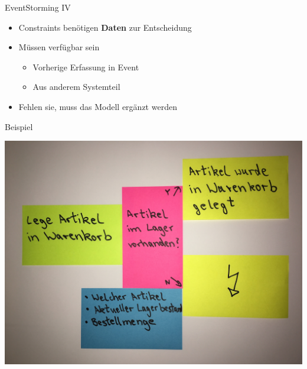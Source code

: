 
\begin{frame}[fragile]{EventStorming IV}

\begin{itemize}
\item Constraints benötigen \textbf{Daten} zur Entscheidung
\item Müssen verfügbar sein
\begin{itemize}
\item Vorherige Erfassung in Event
\item Aus anderem Systemteil
\end{itemize}
\item Fehlen sie, muss das Modell ergänzt werden
\end{itemize}

\end{frame}

\begin{frame}[fragile]{Beispiel}

\begin{center}
\includegraphics[width=.85\textwidth]{pics/eventstorming4.jpg}
\end{center}

\end{frame}


